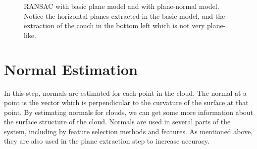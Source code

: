 \documentclass[11pt,a4paper]{kth-mag}
\begin{document}
\begin{figure}[H]
  \centering
  \caption{RANSAC with basic plane model and with plane-normal model. Notice the
    horizontal planes extracted in the basic model, and the extraction of the
    couch in the bottom left which is not very plane-like.}
  \label{fig:planenormal}
\end{figure}
\section{Normal Estimation}
In this step, normals are estimated for each point in the cloud. The normal at a
point is the vector which is perpendicular to the curvature of the surface at
that point. By estimating normals for clouds, we can get some more information
about the surface structure of the cloud. Normals are used in several parts of
the system, including by feature selection methods and features. As mentioned
above, they are also used in the plane extraction step to increase accuracy.
\end{document}
